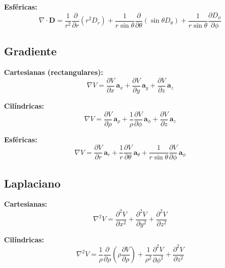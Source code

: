 \documentclass[11pt]{article}
\begin{document}
\textbf{Esféricas:}
\begin{equation}
    \nabla \cdot \mathbf{D} = \frac{1}{r^2} \frac{\partial}{\partial r} (r^2 D_r) + \frac{1}{r \sin \theta} \frac{\partial}{\partial \theta} (\sin \theta D_\theta) + \frac{1}{r \sin \theta} \frac{\partial D_\phi}{\partial \phi}
\end{equation}

\subsection{Gradiente}

\textbf{Cartesianas (rectangulares):}
\begin{equation}
    \nabla V = \frac{\partial V}{\partial x} \, \mathbf{a}_x + \frac{\partial V}{\partial y} \, \mathbf{a}_y + \frac{\partial V}{\partial z} \, \mathbf{a}_z
\end{equation}

\textbf{Cilíndricas:}
\begin{equation}
    \nabla V = \frac{\partial V}{\partial \rho} \, \mathbf{a}_\rho + \frac{1}{\rho} \frac{\partial V}{\partial \phi} \, \mathbf{a}_\phi + \frac{\partial V}{\partial z} \, \mathbf{a}_z
\end{equation}

\textbf{Esféricas:}
\begin{equation}
    \nabla V = \frac{\partial V}{\partial r} \, \mathbf{a}_r + \frac{1}{r} \frac{\partial V}{\partial \theta} \, \mathbf{a}_\theta + \frac{1}{r \sin \theta} \frac{\partial V}{\partial \phi} \, \mathbf{a}_\phi
\end{equation}


\subsection{Laplaciano}

\textbf{Cartesianas:}
\begin{equation}
    \nabla^2 V = \frac{\partial^2 V}{\partial x^2} + \frac{\partial^2 V}{\partial y^2} + \frac{\partial^2 V}{\partial z^2}
\end{equation}

\textbf{Cilíndricas:}
\begin{equation}
    \nabla^2 V = \frac{1}{\rho} \frac{\partial}{\partial \rho} \left( \rho \frac{\partial V}{\partial \rho} \right) + \frac{1}{\rho^2} \frac{\partial^2 V}{\partial \phi^2} + \frac{\partial^2 V}{\partial z^2}
\end{equation}
\end{document}
